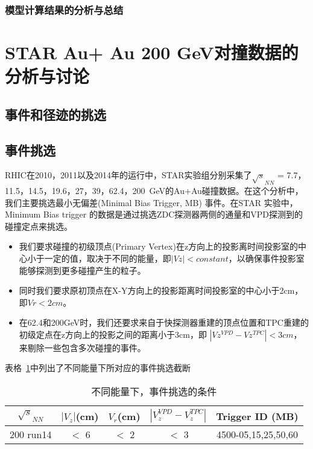 \subsubsection{模型计算结果的分析与总结}





\section{STAR Au+ Au 200 GeV对撞数据的分析与讨论}

\subsection{事件和径迹的挑选}

\subsection{事件挑选}
RHIC在2010，2011以及2014年的运行中，STAR实验组分别采集了$\sqrt{s}_{NN}$ = 7.7，11.5，14.5，19.6，27，39，62.4，200~GeV的Au+Au碰撞数据。在这个分析中，我们主要挑选最小无偏差(Minimal Bias Trigger, MB) 事件。在STAR 实验中，Minimum Bias trigger 的数据是通过挑选ZDC探测器两侧的通量和VPD探测到的碰撞定点来挑选。

\begin{itemize}
\item 我们要求碰撞的初级顶点(Primary Vertex)在z方向上的投影离时间投影室的中心小于一定的值，取决于不同的能量，即$|Vz| < constant$，以确保事件投影室能够探测到更多碰撞产生的粒子。
\item 同时我们要求原初顶点在X-Y方向上的投影距离时间投影室的中心小于2cm，即$Vr < 2cm$。
\item 在62.4和200GeV时，我们还要求来自于快探测器重建的顶点位置和TPC重建的初级定点在z方向上的投影之间的距离小于3cm，即 $|Vz^{VPD}-Vz^{TPC}| < 3cm$，来剔除一些包含多次碰撞的事件。
\end{itemize}
表格~\ref{tab:Event_cut}中列出了不同能量下所对应的事件挑选截断

\begin{table}[htb]
\centering
\caption{不同能量下，事件挑选的条件}
\begin{tabular}{c|c|c|c|c}
\toprule
$\sqrt{s}_{NN}$  &  $|V_{z}|$(cm)  &  $V_{r}$(cm)  &  $|V_{z}^{VPD}-V_{z}^{TPC}|$  &  Trigger ID (MB)                          \\ \hline
200 run14        &  $<$ 6          &  $<$ 2        &  $<$ 3                        &  4500-05,15,25,50,60         \\ 
\bottomrule
\end{tabular}
\label{tab:Event_cut}
\end{table}


